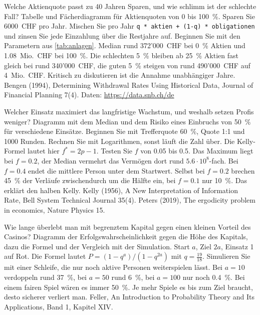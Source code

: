 {Welche Aktienquote passt zu 40 Jahren Sparen, und wie schlimm ist der schlechte Fall?}
{Tabelle und Fächerdiagramm für Aktienquoten von 0 bis 100~\%.}
{Sparen Sie 6000~CHF pro Jahr. Mischen Sie pro Jahr \texttt{q * aktien + (1-q) * obligationen} und zinsen Sie jede Einzahlung über die Restjahre auf. Beginnen Sie mit den Parametern aus \cref{tab:anlagen}.}
{Median rund 372'000~CHF bei 0~\% Aktien und 1.08~Mio.~CHF bei 100~\%. Die schlechten 5~\% bleiben ab 25~\% Aktien fast gleich bei rund 340'000~CHF, die guten 5~\% steigen von rund 490'000~CHF auf 4~Mio.~CHF. Kritisch zu diskutieren ist die Annahme unabhängiger Jahre.}
{Bengen (1994), Determining Withdrawal Rates Using Historical Data, Journal of Financial Planning 7(4). Daten: \url{https://data.snb.ch/de}}

{Welcher Einsatz maximiert das langfristige Wachstum, und weshalb setzen Profis weniger?}
{Diagramm mit dem Median und dem Risiko eines Einbruchs von 50~\% für verschiedene Einsätze.}
{Beginnen Sie mit Trefferquote 60~\%, Quote 1:1 und 1000 Runden. Rechnen Sie mit Logarithmen, sonst läuft die Zahl über. Die Kelly-Formel lautet hier $f^* = 2p - 1$. Testen Sie $f$ von 0.05 bis 0.5.}
{Das Maximum liegt bei $f = 0.2$, der Median vermehrt das Vermögen dort rund $5.6 \cdot 10^{8}$-fach. Bei $f = 0.4$ endet die mittlere Person unter dem Startwert. Selbst bei $f = 0.2$ brechen 45~\% der Verläufe zwischendurch um die Hälfte ein, bei $f = 0.1$ nur 10~\%. Das erklärt den halben Kelly.}
{Kelly (1956), A New Interpretation of Information Rate, Bell System Technical Journal 35(4). Peters (2019), The ergodicity problem in economics, Nature Physics 15.}

{Wie lange überlebt man mit begrenztem Kapital gegen einen kleinen Vorteil des Casinos?}
{Diagramm der Erfolgswahrscheinlichkeit gegen die Höhe des Kapitals, dazu die Formel und der Vergleich mit der Simulation.}
{Start $a$, Ziel $2a$, Einsatz 1 auf Rot. Die Formel lautet $P = (1-q^a)/(1-q^{2a})$ mit $q = \frac{19}{18}$. Simulieren Sie mit einer Schleife, die nur noch aktive Personen weiterspielen lässt.}
{Bei $a = 10$ verdoppeln rund 37~\%, bei $a = 50$ rund 6~\%, bei $a = 100$ nur noch 0.4~\%. Bei einem fairen Spiel wären es immer 50~\%. Je mehr Spiele es bis zum Ziel braucht, desto sicherer verliert man.}
{Feller, An Introduction to Probability Theory and Its Applications, Band 1, Kapitel XIV.}

